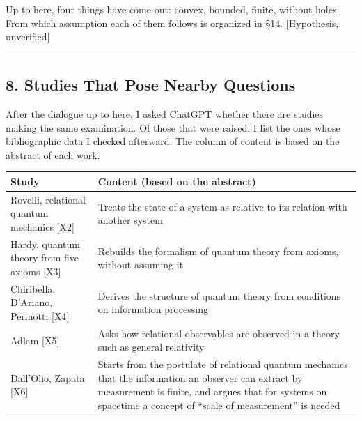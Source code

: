 \documentclass[
  a4paper,
]{article}
\newcounter{none} %
\begin{document}
Up to here, four things have come out: convex, bounded, finite, without
holes. From which assumption each of them follows is organized in §14.
{[}Hypothesis, unverified{]}

\begin{center}\rule{0.5\linewidth}{0.5pt}\end{center}

\subsection{8. Studies That Pose Nearby
Questions}\label{studies-that-pose-nearby-questions}

After the dialogue up to here, I asked ChatGPT whether there are studies
making the same examination. Of those that were raised, I list the ones
whose bibliographic data I checked afterward. The column of content is
based on the abstract of each work.

{\def\LTcaptype{none} %
\begin{longtable}[]{@{}
  >{\raggedright\arraybackslash}p{}
  >{\raggedright\arraybackslash}p{}@{}}
\toprule\noalign{}
\begin{minipage}[b]{\linewidth}\raggedright
Study
\end{minipage} & \begin{minipage}[b]{\linewidth}\raggedright
Content (based on the abstract)
\end{minipage} \\
\midrule\noalign{}
\endhead
\bottomrule\noalign{}
\endlastfoot
Rovelli, relational quantum mechanics {[}X2{]} & Treats the state of a
system as relative to its relation with another system \\
Hardy, quantum theory from five axioms {[}X3{]} & Rebuilds the formalism
of quantum theory from axioms, without assuming it \\
Chiribella, D'Ariano, Perinotti {[}X4{]} & Derives the structure of
quantum theory from conditions on information processing \\
Adlam {[}X5{]} & Asks how relational observables are observed in a
theory such as general relativity \\
Dall'Olio, Zapata {[}X6{]} & Starts from the postulate of relational
quantum mechanics that the information an observer can extract by
measurement is finite, and argues that for systems on spacetime a
concept of ``scale of measurement'' is needed \\
\end{longtable}
}
\end{document}
